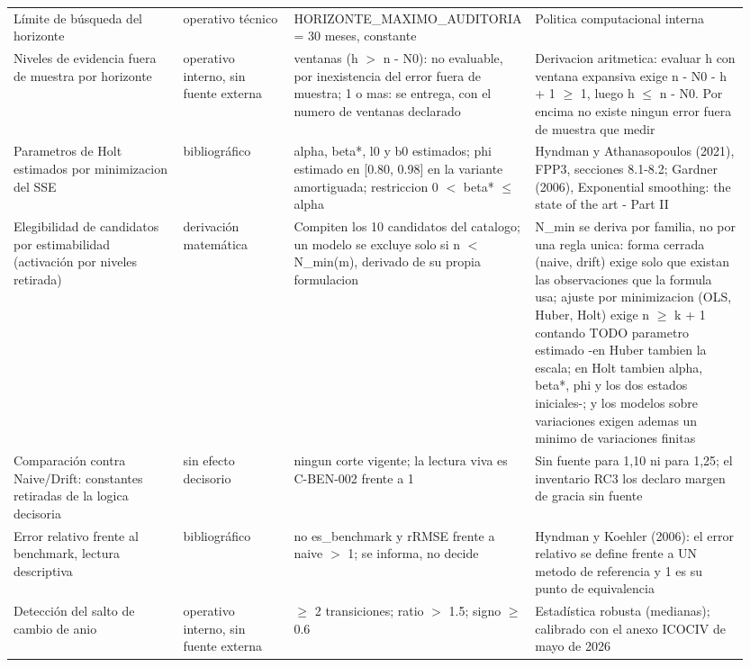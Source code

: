 {\begin{longtable}{@{}>{\raggedright\arraybackslash}p{0.238\linewidth}>{\raggedright\arraybackslash}p{0.152\linewidth}>{\raggedright\arraybackslash}p{0.266\linewidth}>{\raggedright\arraybackslash}p{0.295\linewidth}@{}}
Límite de búsqueda del horizonte & operativo técnico & HORIZONTE\_\allowbreak{}MAXIMO\_\allowbreak{}AUDITORIA = 30 meses, constante & Politica computacional interna \\
Niveles de evidencia fuera de muestra por horizonte & operativo interno, sin fuente externa & 0 ventanas (h $>$ n - N0): no evaluable, por inexistencia del error fuera de muestra; 1 o mas: se entrega, con el numero de ventanas declarado & Derivacion aritmetica: evaluar h con ventana expansiva exige n - N0 - h + 1 $\geq$ 1, luego h $\leq$ n - N0. Por encima no existe ningun error fuera de muestra que medir \\
Parametros de Holt estimados por minimizacion del SSE & bibliográfico & alpha, beta*, l0 y b0 estimados; phi estimado en [0.80, 0.98] en la variante amortiguada; restriccion 0 $<$ beta* $\leq$ alpha & Hyndman y Athanasopoulos (2021), FPP3, secciones 8.1-8.2; Gardner (2006), Exponential smoothing: the state of the art - Part II \\
Elegibilidad de candidatos por estimabilidad (activación por niveles retirada) & derivación matemática & Compiten los 10 candidatos del catalogo; un modelo se excluye solo si n $<$ N\_\allowbreak{}min(m), derivado de su propia formulacion & N\_\allowbreak{}min se deriva por familia, no por una regla unica: forma cerrada (naive, drift) exige solo que existan las observaciones que la formula usa; ajuste por minimizacion (OLS, Huber, Holt) exige n $\geq$ k + 1 contando TODO parametro estimado -en Huber tambien la escala; en Holt tambien alpha, beta*, phi y los dos estados iniciales-; y los modelos sobre variaciones exigen ademas un minimo de variaciones finitas \\
Comparación contra Naive/Drift: constantes retiradas de la logica decisoria & sin efecto decisorio & ningun corte vigente; la lectura viva es C-BEN-002 frente a 1 & Sin fuente para 1,10 ni para 1,25; el inventario RC3 los declaro margen de gracia sin fuente \\
Error relativo frente al benchmark, lectura descriptiva & bibliográfico & no es\_\allowbreak{}benchmark y rRMSE frente a naive $>$ 1; se informa, no decide & Hyndman y Koehler (2006): el error relativo se define frente a UN metodo de referencia y 1 es su punto de equivalencia \\
Detección del salto de cambio de anio & operativo interno, sin fuente externa & $\geq$ 2 transiciones; ratio $>$ 1.5; signo $\geq$ 0.6 & Estadística robusta (medianas); calibrado con el anexo ICOCIV de mayo de 2026 \\

\end{longtable}}
